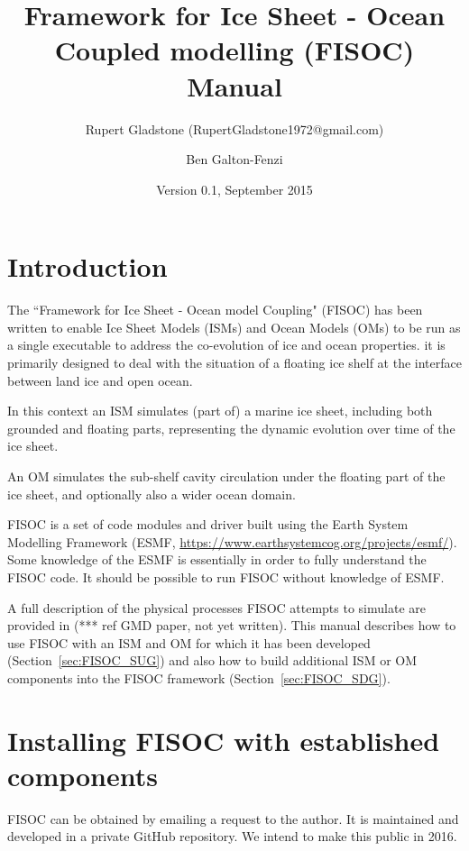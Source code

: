 \documentclass[12pt]{article}
\begin{document}
\title{Framework for Ice Sheet - Ocean Coupled modelling (FISOC) Manual}
\author{Rupert Gladstone (RupertGladstone1972@gmail.com) \and Ben Galton-Fenzi}
\date{Version 0.1, September 2015}
\maketitle

\newpage 
\tableofcontents
\newpage 

\section{Introduction}

The ``Framework for Ice Sheet - Ocean model Coupling" (FISOC) has been written to enable Ice Sheet Models 
(ISMs) and Ocean Models (OMs) to be run as a single executable to address the co-evolution of ice and ocean 
properties.  it is primarily designed to deal with the situation of a floating ice shelf at the interface 
between land ice and open ocean.

In this context an ISM simulates (part of) a marine ice sheet, including both grounded and floating parts, 
representing the dynamic evolution over time of the ice sheet.

An OM simulates the sub-shelf cavity circulation under the floating part of the ice sheet, and optionally also 
a wider ocean domain.

FISOC is a set of code modules and driver built using the Earth System Modelling Framework (ESMF, 
\url{https://www.earthsystemcog.org/projects/esmf/}). 
Some knowledge of the ESMF is essentially in order to fully understand the FISOC code.  It should 
be possible to run FISOC without knowledge of ESMF.

A full description of the physical processes FISOC attempts to simulate are provided in (***
ref GMD paper, not yet written).  
This manual describes how to use FISOC with an ISM and OM for which it has been 
developed (Section~\ref{sec:FISOC_SUG}) and also how to build additional ISM or OM components 
into the FISOC framework (Section~\ref{sec:FISOC_SDG}).




\section{Installing FISOC with established components}
\label{sec:FISOC_install}

FISOC can be obtained by emailing a request to the author.  It is maintained and developed in a 
private GitHub repository.  We intend to make this public in 2016.
\end{document}
